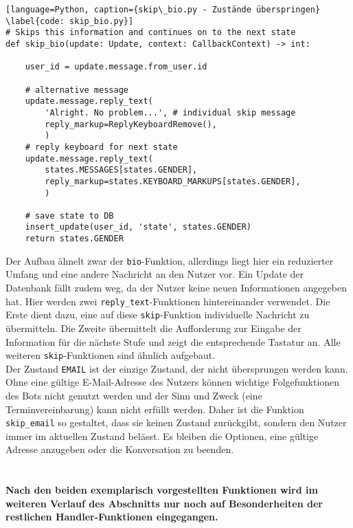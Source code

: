             \begin{lstlisting}[language=Python, caption={skip\_bio.py - Zustände überspringen} \label{code: skip_bio.py}]
# Skips this information and continues on to the next state
def skip_bio(update: Update, context: CallbackContext) -> int:
    
    user_id = update.message.from_user.id

    # alternative message
    update.message.reply_text(
        'Alright. No problem...', # individual skip message
        reply_markup=ReplyKeyboardRemove(),
        )
    # reply keyboard for next state
    update.message.reply_text(
        states.MESSAGES[states.GENDER],
        reply_markup=states.KEYBOARD_MARKUPS[states.GENDER],
        )    

    # save state to DB
    insert_update(user_id, 'state', states.GENDER)
    return states.GENDER
            \end{lstlisting}

                Der Aufbau ähnelt zwar der \verb|bio|-Funktion, allerdings liegt hier ein reduzierter Umfang und eine andere Nachricht an den Nutzer vor. Ein Update der Datenbank fällt zudem weg, da der Nutzer keine neuen Informationen angegeben hat. Hier werden zwei \verb|reply_text|-Funktionen hintereinander verwendet. Die Erste dient dazu, eine auf diese \verb|skip|-Funktion individuelle Nachricht zu übermitteln. Die Zweite  übermittelt die Aufforderung zur Eingabe der Information für die nächste Stufe und zeigt die entsprechende Tastatur an. Alle weiteren \verb|skip|-Funktionen sind ähnlich aufgebaut.\\
                Der Zustand \verb|EMAIL| ist der einzige Zustand, der nicht übersprungen werden kann. Ohne eine gültige E-Mail-Adresse des Nutzers können wichtige Folgefunktionen des Bots nicht genutzt werden und der Sinn und Zweck (eine Terminvereinbarung) kann nicht erfüllt werden. Daher ist die Funktion \verb|skip_email| so gestaltet, dass sie keinen Zustand zurückgibt, sondern den Nutzer immer im aktuellen Zustand belässt. Es bleiben die Optionen, eine gültige Adresse anzugeben oder die Konversation zu beenden.\\ \\

        \paragraph{Nach den beiden exemplarisch vorgestellten Funktionen wird im weiteren Verlauf des Abschnitts nur noch auf Besonderheiten der restlichen Handler-Funktionen eingegangen.}

